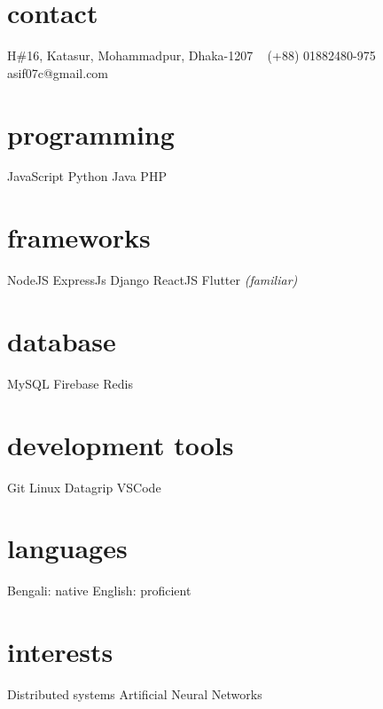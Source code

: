\documentclass[print]{exponential-cv} %
\begin{document}

\begin{aside}
	\section{contact}
	H\#16, Katasur, Mohammadpur, Dhaka-1207
	~
	(+88) 01882480-975
	asif07c@gmail.com
	~
	\href{https://linkedin.com/in/aasifislam}{}
	~
	\section{programming}
	JavaScript
	Python
	Java
	PHP
	~
	\section{frameworks}
	NodeJS
	ExpressJs
	Django
	ReactJS
	Flutter \emph{(familiar)}
	~
	\section{database}
	MySQL
	Firebase
	Redis
	~
	\section{development tools}
	Git
	Linux
	Datagrip
	VSCode
	~
	\section{languages}
	Bengali: native
	English: proficient
	~
	\section{interests}
	Distributed systems
	Artificial Neural Networks
\end{aside}
\end{document}
